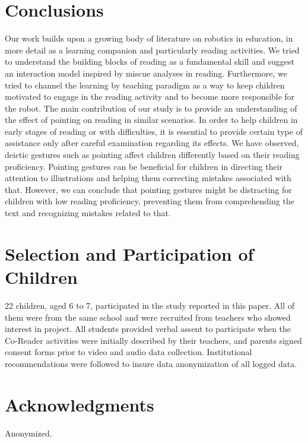 \documentclass{sigchi}
\begin{document}
\section{Conclusions}
Our work builds upon a growing body of literature on robotics in education, in more detail as a learning companion and particularly reading activities. 
We tried to understand the building blocks of reading as a fundamental skill and suggest an interaction model inspired by miscue analyses in reading. 
Furthermore, we tried to channel the learning by teaching paradigm as a way to keep children motivated to engage in the reading activity and to become more responsible for the robot. 
The main contribution of our study is to provide an understanding of the effect of pointing on reading in similar scenarios.
In order to help children in early stages of reading or with difficulties, it is essential to provide certain type of assistance only after careful examination regarding its effects.
We have observed, deictic gestures such as pointing affect children differently based on their reading proficiency. 
Pointing gestures can be beneficial for children in directing their attention to illustrations and helping them correcting mistakes associated with that.
However, we can conclude that pointing gestures might be distracting for children with low reading proficiency, preventing them from comprehending the text and recognizing mistakes related to that.

\section{Selection and Participation of Children}
22  children,  aged  6  to  7,  participated  in  the  study  reported in  this  paper.  All  of  them  were  from  the same school and 
were  recruited  from teachers who showed interest in project. 
All  students  provided  verbal  assent  to  participate when  the  Co-Reader  activities  were  initially  described  by their teachers,  and  parents  signed  consent  forms  prior  to video  and  audio  data  collection. 
Institutional recommendations were followed to insure data anonymization of all logged data.

\section{Acknowledgments}
Anonymized.
\end{document}
